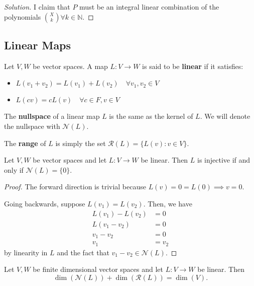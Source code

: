 \begin{proof}[Solution]
I claim that $P$ must be an integral linear combination of the
polynomials $\binom{X}{k} \forall k \in \mathbb{N}$.
\end{proof}

\subsection{Linear Maps}
\begin{df}
Let $V, W$ be vector spaces.  A map $L : V \rightarrow W$ is said to be
\textbf{linear} if it satisfies:
\begin{itemize}
\item $L(v_1 + v_2) = L(v_1) + L(v_2) \quad \forall v_1, v_2 \in V$
\item $L(c v) = c L(v) \quad \forall c \in F, v \in V$
\end{itemize}
\end{df}

\begin{df}
The \textbf{nullspace} of a linear map $L$ is the same as the kernel of
$L$. We will denote the nullspace with $\mathcal{N}(L)$.
\end{df}

\begin{df}
The \textbf{range} of $L$ is simply the set $\mathcal{R}(L) = \lbrace
L(v) : v \in V \rbrace$.
\end{df}

\begin{prop}
Let $V, W$ be vector spaces and let $L : V \rightarrow W$ be linear.
Then $L$ is injective if and only if $\mathcal{N}(L) = \lbrace 0
\rbrace$.
\end{prop}

\begin{proof}
The forward direction is trivial because $L(v) = 0 = L(0) \implies v =
0$.

Going backwards, suppose $L(v_1) = L(v_2)$. Then, we have
\[ \begin{aligned}
L(v_1) - L(v_2) &= 0 \\
L(v_1 - v_2) &= 0 \\
v_1 - v_2 &= 0 \\
v_1 &= v_2
\end{aligned} \]
by linearity in $L$ and the fact that $v_1 - v_2 \in \mathcal{N}(L)$.
\end{proof}

\begin{thm}
Let $V, W$ be finite dimensional vector spaces and let $L : V
\rightarrow W$ be linear. Then
\[ \dim(\mathcal{N}(L)) + \dim(\mathcal{R}(L)) = \dim(V). \]
\end{thm}

